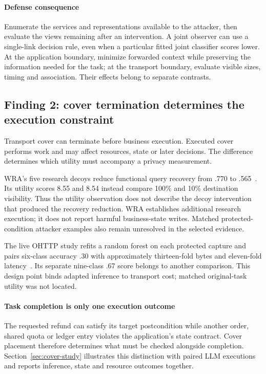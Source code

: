 \paragraph{Defense consequence}
Enumerate the services and representations available to the attacker, then evaluate the views remaining after an intervention. A joint observer can use a single-link decision rule, even when a particular fitted joint classifier scores lower. At the application boundary, minimize forwarded context while preserving the information needed for the task; at the transport boundary, evaluate visible sizes, timing and association. Their effects belong to separate contrasts.

\subsection{Finding 2: cover termination determines the execution constraint}\label{sec:crosslink}
Transport cover can terminate before business execution. Executed cover performs work and may affect resources, state or later decisions. The difference determines which utility must accompany a privacy measurement.

WRA's five research decoys reduce functional query recovery from .770 to .565~\cite[Sec.~8.1]{jeong2026wra}. Its utility scores 8.55 and 8.54 instead compare 100\% and 10\% destination visibility. Thus the utility observation does not describe the decoy intervention that produced the recovery reduction. WRA establishes additional research execution; it does not report harmful business-state writes. Matched protected-condition attacker examples also remain unresolved in the selected evidence.

The live OHTTP study refits a random forest on each protected capture and pairs six-class accuracy .30 with approximately thirteen-fold bytes and eleven-fold latency~\cite[Sec.~9.7]{dangol2026workflow}. Its separate nine-class .67 score belongs to another comparison. This design point binds adapted inference to transport cost; matched original-task utility was not located.

\paragraph{Task completion is only one execution outcome}
The requested refund can satisfy its target postcondition while another order, shared quota or ledger entry violates the application's state contract. Cover placement therefore determines what must be checked alongside completion. Section~\ref{sec:cover-study} illustrates this distinction with paired LLM executions and reports inference, state and resource outcomes together.

